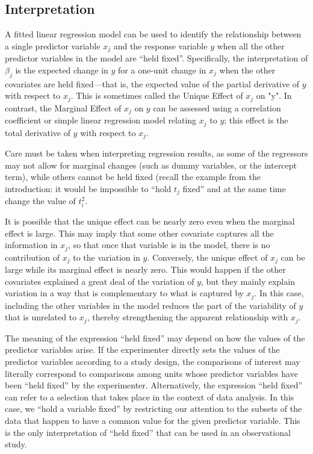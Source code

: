 \subsection{Interpretation}

A fitted linear regression model can be used to identify the relationship between a single predictor variable $x_j$ and the response variable $y$ when all the other predictor variables in the model are “held fixed”. Specifically, the interpretation of $\beta_j$ is the expected change in $y$ for a one-unit change in $x_j$ when the other covariates are held fixed—that is, the expected value of the partial derivative of $y$ with respect to $x_j$. This is sometimes called the Unique Effect of $x_j$ on "y". In contrast, the Marginal Effect of $x_j$ on $y$ can be assessed using a correlation coefficient or simple linear regression model relating $x_j$ to $y$; this effect is the total derivative of $y$ with respect to $x_j$.

Care must be taken when interpreting regression results, as some of the regressors may not allow for marginal changes (such as dummy variables, or the intercept term), while others cannot be held fixed (recall the example from the introduction: it would be impossible to “hold $t_j$ fixed” and at the same time change the value of $t_i^2$.

It is possible that the unique effect can be nearly zero even when the marginal effect is large. This may imply that some other covariate captures all the information in $x_j$, so that once that variable is in the model, there is no contribution of $x_j$ to the variation in $y$. Conversely, the unique effect of $x_j$ can be large while its marginal effect is nearly zero. This would happen if the other covariates explained a great deal of the variation of $y$, but they mainly explain variation in a way that is complementary to what is captured by $x_j$. In this case, including the other variables in the model reduces the part of the variability of $y$ that is unrelated to $x_j$, thereby strengthening the apparent relationship with $x_j$.

The meaning of the expression “held fixed” may depend on how the values of the predictor variables arise. If the experimenter directly sets the values of the predictor variables according to a study design, the comparisons of interest may literally correspond to comparisons among units whose predictor variables have been “held fixed” by the experimenter. Alternatively, the expression “held fixed” can refer to a selection that takes place in the context of data analysis. In this case, we “hold a variable fixed” by restricting our attention to the subsets of the data that happen to have a common value for the given predictor variable. This is the only interpretation of “held fixed” that can be used in an observational study.

